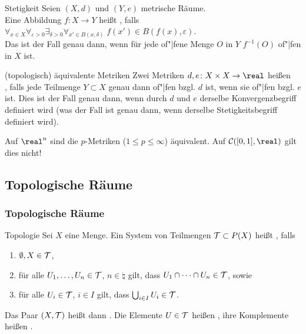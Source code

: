 \begin{Def}{Stetigkeit}
    Seien $(X, d)$ und $(Y, e)$ metrische Räume. \\
    Eine Abbildung $f\colon X \rightarrow Y$ heißt , falls
    $\forall_{x \in X} \forall_{\varepsilon > 0} \exists_{\delta > 0}
    \forall_{x' \in B(x, \delta)}\; f(x') \in B(f(x), \varepsilon)$. \\
    Das ist der Fall genau dann, wenn für jede of"|fene Menge $O$ in $Y$
    $f^{-1}(O)$ of"|fen in $X$ ist.
\end{Def}

\linie

\begin{Def}{(topologisch) äquivalente Metriken}
    Zwei Metriken $d, e\colon X \times X \rightarrow \real$ heißen \\
    , falls jede Teilmenge $Y \subset X$
    genau dann of"|fen bzgl. $d$ ist, wenn sie of"|fen bzgl. $e$ ist.
    Dies ist der Fall genau dann, wenn durch $d$ und $e$ derselbe
    Konvergenzbegriff definiert wird
    (was der Fall ist genau dann, wenn derselbe Stetigkeitsbegriff
    definiert wird).
\end{Def}

\begin{Bsp}
    Auf $\real^n$ sind die $p$-Metriken ($1 \le p \le \infty$) äquivalent.
    Auf $\C([0,1], \real)$ gilt dies nicht!
\end{Bsp}

\pagebreak

\subsection{%
    Topologische Räume%
}

\subsubsection{%
    Topologische Räume%
}

\begin{Def}{Topologie}
    Sei $X$ eine Menge.
    Ein System von Teilmengen $\mathcal{T} \subset P(X)$ heißt ,
    falls
    \begin{enumerate}[label=(O\arabic*)]
        \item
        $\emptyset, X \in \mathcal{T}$,

        \item
        für alle $U_1, \dotsc, U_n \in \mathcal{T}$, $n \in \natural$ gilt, dass
        $U_1 \cap \dotsb \cap U_n \in \mathcal{T}$, sowie

        \item
        für alle $U_i \in \mathcal{T}$, $i \in I$ gilt, dass
        $\bigcup_{i \in I} U_i \in \mathcal{T}$.
    \end{enumerate}
    Das Paar $(X, \mathcal{T})$ heißt dann .
    Die Elemente $U \in \mathcal{T}$ heißen ,
    ihre Komplemente heißen .
\end{Def}

